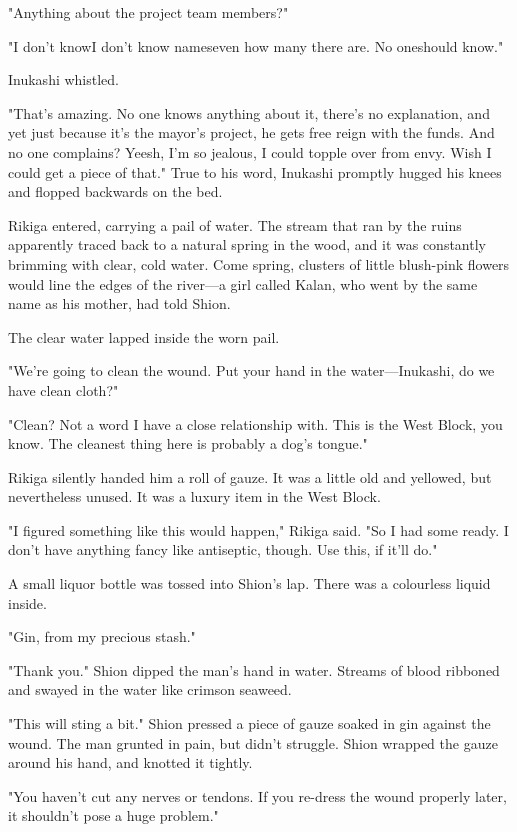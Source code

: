 "Anything about the project team members?"

"I don't know\el I don't know names\el even how many there are. No
one\el should know."

Inukashi whistled.

"That's amazing. No one knows anything about it, there's no explanation,
and yet just because it's the mayor's project, he gets free reign with
the funds. And no one complains? Yeesh, I'm so jealous, I could topple
over from envy. Wish I could get a piece of that." True to his word,
Inukashi promptly hugged his knees and flopped backwards on the bed.

Rikiga entered, carrying a pail of water. The stream that ran by the
ruins apparently traced back to a natural spring in the wood, and it was
constantly brimming with clear, cold water. Come spring, clusters of
little blush-pink flowers would line the edges of the river---a girl
called Kalan, who went by the same name as his mother, had told Shion.

The clear water lapped inside the worn pail.

"We're going to clean the wound. Put your hand in the water---Inukashi, do
we have clean cloth?"

"Clean? Not a word I have a close relationship with. This is the West
Block, you know. The cleanest thing here is probably a dog's tongue."

Rikiga silently handed him a roll of gauze. It was a little old and
yellowed, but nevertheless unused. It was a luxury item in the West
Block.

"I figured something like this would happen," Rikiga said. "So I had
some ready. I don't have anything fancy like antiseptic, though. Use
this, if it'll do."

A small liquor bottle was tossed into Shion's lap. There was a
colourless liquid inside.

"Gin, from my precious stash."

"Thank you." Shion dipped the man's hand in water. Streams of blood
ribboned and swayed in the water like crimson seaweed.

"This will sting a bit." Shion pressed a piece of gauze soaked in gin
against the wound. The man grunted in pain, but didn't struggle. Shion
wrapped the gauze around his hand, and knotted it tightly.

"You haven't cut any nerves or tendons. If you re-dress the wound
properly later, it shouldn't pose a huge problem."


